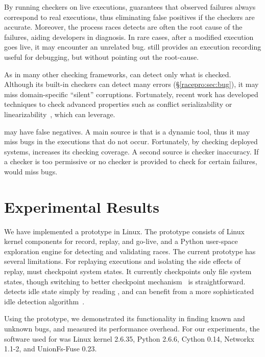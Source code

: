 By running checkers on live executions, \racepro guarantees that observed
failures always correspond to real executions, thus eliminating false
positives if the checkers are accurate.  Moreover, the process races \racepro
detects are often the root cause of the failures, aiding developers in
diagnosis.  In rare cases, after a modified execution goes live, it may
encounter an unrelated bug.  \racepro still provides an execution recording
useful for debugging, but without pointing out the root-cause.

As in many other checking frameworks, \racepro can detect only what is checked.
Although its built-in checkers can detect many errors
(\S\ref{racepro:sec:bug}), it may miss domain-specific ``silent''
corruptions.  Fortunately, recent work has developed techniques to check
advanced properties such as conflict serializability or
linearizability~\cite{linearizable:eurosys11}, which \racepro can leverage.

\racepro may have false negatives.  A main source is that \racepro is a dynamic
tool, thus it may miss bugs in the executions that do not occur.
Fortunately, by checking deployed systems, \racepro increases its checking
coverage.  A second source is checker inaccuracy.  If a checker is too
permissive or no checker is provided to check for certain failures, \racepro
would miss bugs.

\section{Experimental Results} \label{racepro:sec:eval}

We have implemented a \racepro prototype in Linux.  The prototype
consists of Linux kernel components for record, replay, and go-live, and a
Python user-space exploration engine for detecting and
validating races.  The current prototype has several limitations.  For
replaying executions and isolating the side effects of replay, \racepro
must checkpoint system states.  It currently checkpoints only file
system states, though switching to better checkpoint
mechanism~\cite{zap:osdi02} is straightforward.  \racepro detects idle
state simply by reading , and can benefit from a more
sophisticated idle detection algorithm~\cite{boinc}.

Using the \racepro prototype, we demonstrated its functionality in finding
known and unknown bugs, and measured its performance overhead.  For
our experiments, the software used for \racepro was Linux kernel 2.6.35,
Python 2.6.6, Cython 0.14, Networkx 1.1-2, and UnionFs-Fuse 0.23.


